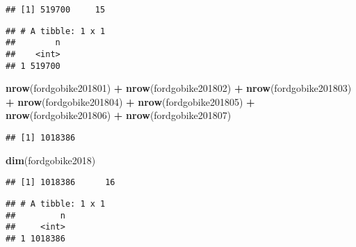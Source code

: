 \documentclass[]{article}
\newenvironment{Shaded}{\begin{snugshade}}{\end{snugshade}}
\newcommand{\KeywordTok}[1]{\textcolor[rgb]{0.13,0.29,0.53}{\textbf{#1}}}
\newcommand{\NormalTok}[1]{#1}
\newcommand{\OperatorTok}[1]{\textcolor[rgb]{0.81,0.36,0.00}{\textbf{#1}}}
\newcommand{\StringTok}[1]{\textcolor[rgb]{0.31,0.60,0.02}{#1}}
\begin{document}
\begin{verbatim}
## [1] 519700     15
\end{verbatim}

\begin{Shaded}
\end{Shaded}

\begin{verbatim}
## # A tibble: 1 x 1
##        n
##    <int>
## 1 519700
\end{verbatim}

\begin{Shaded}
\begin{Highlighting}[]
\KeywordTok{nrow}\NormalTok{(fordgobike201801) }\OperatorTok{+}\StringTok{ }\KeywordTok{nrow}\NormalTok{(fordgobike201802) }\OperatorTok{+}\StringTok{ }\KeywordTok{nrow}\NormalTok{(fordgobike201803) }\OperatorTok{+}\StringTok{ }\KeywordTok{nrow}\NormalTok{(fordgobike201804) }\OperatorTok{+}\StringTok{ }\KeywordTok{nrow}\NormalTok{(fordgobike201805) }\OperatorTok{+}\StringTok{ }\KeywordTok{nrow}\NormalTok{(fordgobike201806) }\OperatorTok{+}\StringTok{ }\KeywordTok{nrow}\NormalTok{(fordgobike201807)}
\end{Highlighting}
\end{Shaded}

\begin{verbatim}
## [1] 1018386
\end{verbatim}

\begin{Shaded}
\begin{Highlighting}[]
\KeywordTok{dim}\NormalTok{(fordgobike2018)}
\end{Highlighting}
\end{Shaded}

\begin{verbatim}
## [1] 1018386      16
\end{verbatim}

\begin{Shaded}
\end{Shaded}

\begin{verbatim}
## # A tibble: 1 x 1
##         n
##     <int>
## 1 1018386
\end{verbatim}
\end{document}

